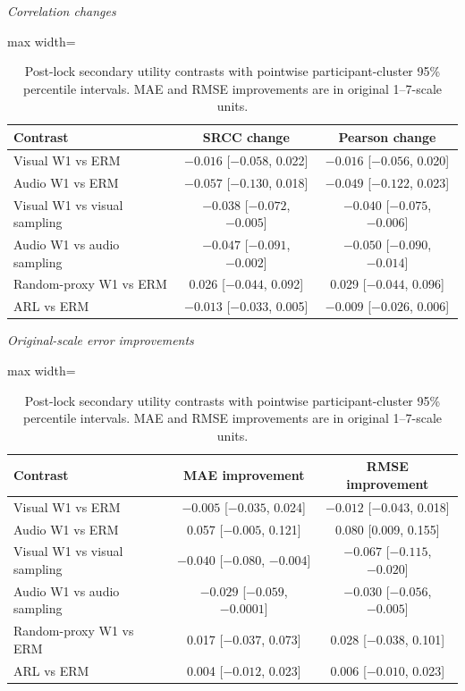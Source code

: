 \begin{table}[htbp]
\centering
\caption{Post-lock secondary utility contrasts with pointwise participant-cluster 95\% percentile
intervals. MAE and RMSE improvements are in original 1--7-scale units.}
\label{tab:stage-a-utility-contrasts}
\small
\textit{Correlation changes}\par\smallskip
\begin{adjustbox}{max width=\textwidth}
\begin{tabular}{lcc}
\toprule
Contrast & SRCC change & Pearson change \\
\midrule
Visual W1 vs ERM & $-0.016$ [$-0.058$, 0.022] & $-0.016$ [$-0.056$, 0.020] \\
Audio W1 vs ERM & $-0.057$ [$-0.130$, 0.018] & $-0.049$ [$-0.122$, 0.023] \\
Visual W1 vs visual sampling & $-0.038$ [$-0.072$, $-0.005$] & $-0.040$ [$-0.075$, $-0.006$] \\
Audio W1 vs audio sampling & $-0.047$ [$-0.091$, $-0.002$] & $-0.050$ [$-0.090$, $-0.014$] \\
Random-proxy W1 vs ERM & 0.026 [$-0.044$, 0.092] & 0.029 [$-0.044$, 0.096] \\
ARL vs ERM & $-0.013$ [$-0.033$, 0.005] & $-0.009$ [$-0.026$, 0.006] \\
\bottomrule
\end{tabular}
\end{adjustbox}

\medskip
\textit{Original-scale error improvements}\par\smallskip
\begin{adjustbox}{max width=\textwidth}
\begin{tabular}{lcc}
\toprule
Contrast & MAE improvement & RMSE improvement \\
\midrule
Visual W1 vs ERM & $-0.005$ [$-0.035$, 0.024] & $-0.012$ [$-0.043$, 0.018] \\
Audio W1 vs ERM & 0.057 [$-0.005$, 0.121] & 0.080 [0.009, 0.155] \\
Visual W1 vs visual sampling & $-0.040$ [$-0.080$, $-0.004$] & $-0.067$ [$-0.115$, $-0.020$] \\
Audio W1 vs audio sampling & $-0.029$ [$-0.059$, $-0.0001$] & $-0.030$ [$-0.056$, $-0.005$] \\
Random-proxy W1 vs ERM & 0.017 [$-0.037$, 0.073] & 0.028 [$-0.038$, 0.101] \\
ARL vs ERM & 0.004 [$-0.012$, 0.023] & 0.006 [$-0.010$, 0.023] \\
\bottomrule
\end{tabular}
\end{adjustbox}
\end{table}
\FloatBarrier

